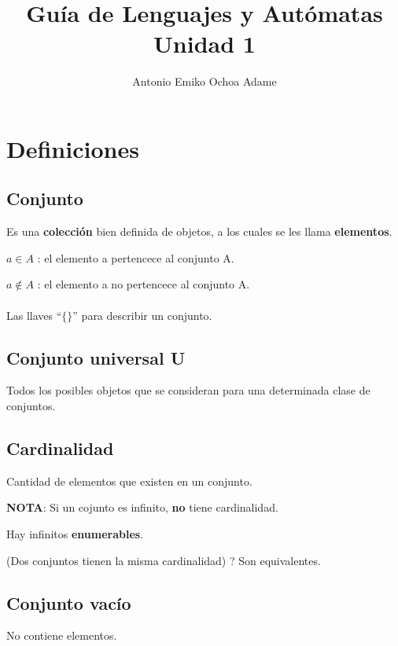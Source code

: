 \documentclass{article}
\begin{document}
\title{Guía de Lenguajes y Autómatas Unidad 1}
\author{Antonio Emiko Ochoa Adame}
\maketitle

\section{Definiciones}

\subsection{Conjunto}

Es una \textbf{colección} bien definida de objetos, a los cuales
se les llama \textbf{elementos}.
\vspace{1em}

$a \in A $ : el elemento a pertencece al conjunto A.

$a \notin A $ : el elemento a no pertencece al conjunto A.

\paragraph{}
Las llaves ``$\{\}$'' para describir un conjunto.

\subsection{Conjunto universal U}

Todos los posibles objetos que se consideran para una determinada clase de
conjuntos.

\subsection{Cardinalidad}

Cantidad de elementos que existen en un conjunto.

\textbf{NOTA}: Si un cojunto es infinito,  \textbf{no} tiene cardinalidad.

Hay infinitos \textbf{enumerables}.

(Dos conjuntos tienen la misma cardinalidad) ? Son equivalentes.

\subsection{Conjunto vacío}

No contiene elementos.
\end{document}
